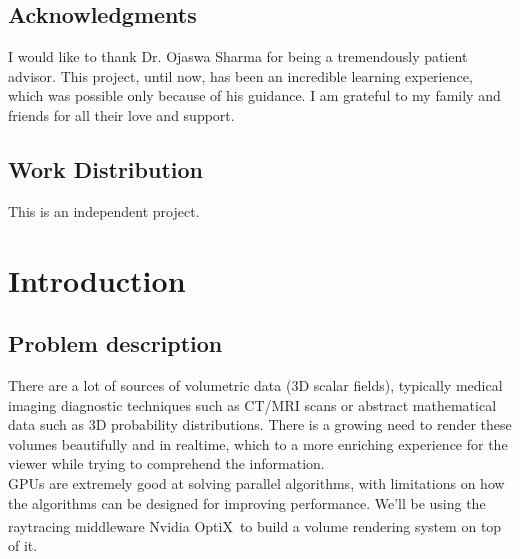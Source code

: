 \documentclass[letterpaper,11pt]{report}
\def\optix{Nvidia\textsuperscript{\textregistered} OptiX\texttrademark\ }
\begin{document}
\newpage



\section*{Acknowledgments}\label{section:acknowledgments}
\pagestyle{plain}

I would like to thank Dr. Ojaswa Sharma for being a tremendously patient advisor. This project, until now, has been an incredible learning experience, which was possible only because of his guidance.
I am grateful to my family and friends for all their love and support.

\vspace{2in}
\section*{Work Distribution}
This is an independent project.

\newpage

\tableofcontents








\chapter{Introduction}\label{chapter:introduction}
\setcounter{page}{1}
\onehalfspacing

\section{Problem description}
There are a lot of sources of volumetric data (3D scalar fields), typically medical imaging diagnostic techniques such as CT/MRI scans or abstract mathematical data such as 3D probability distributions. There is a growing need to render these volumes beautifully and in realtime, which  to a more enriching experience for the viewer while trying to comprehend the information. \\
GPUs are extremely good at solving parallel algorithms, with limitations on how the algorithms can be designed for improving performance. We'll be using the raytracing middleware \optix to build a volume rendering system on top of it.
\end{document}
